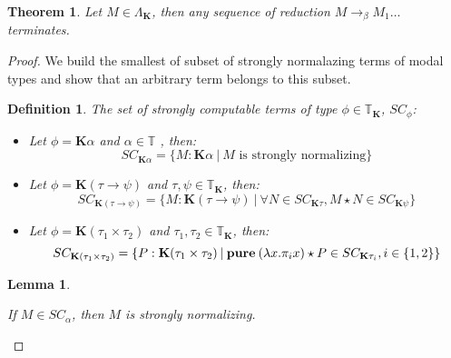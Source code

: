 \documentclass[a4paper]{article}
\newtheorem{theorem}{Theorem}
\newtheorem{lemma}{Lemma}
\newtheorem{defin}{Definition}
\begin{document}
  \begin{theorem}

    Let $M \in \Lambda_{\textbf{K}}$, then any sequence of reduction $M \rightarrow_{\beta} M_1 \dots$ terminates.

  \end{theorem}

  \begin{proof}

  We build the smallest of subset of strongly normalazing terms of modal types and show that an arbitrary
  term belongs to this subset.

  \begin{defin} The set of strongly computable terms of type $\phi \in \mathbb{T}_{\textbf{K}}$, $SC_{\phi}$:

  \begin{itemize}
  \item Let $\phi = \textbf{K}\alpha$ and $\alpha \in \mathbb{T}$ , then:
  \begin{equation}
  SC_{\textbf{K}\alpha} = \{ M : \textbf{K}\alpha \: | \: \text{$M$ is strongly normalizing} \}
  \end{equation}

  \item Let $\phi = \textbf{K}(\tau \to \psi)$ and $\tau, \psi \in \mathbb{T}_{\textbf{K}}$, then:
  \begin{equation}
  SC_{\textbf{K}(\tau \to \psi)} = \{ M : \textbf{K}(\tau \to \psi) \: | \: \forall N \in SC_{\textbf{K}\tau}, M \star N \in SC_{\textbf{K}\psi}\}
  \end{equation}

  \item Let $\phi = \textbf{K}(\tau_1 \times \tau_2)$ and $\tau_1, \tau_2 \in \mathbb{T}_{\textbf{K}}$, then:
  \begin{equation}
  SC_{\textbf{K}(\tau_1 \times \tau_2)} = \{ P : \textbf{K}(\tau_1 \times \tau_2) \: |
  \: {\bf pure \:} (\lambda x. \pi_i x) \star P \in SC_{\textbf{K}\tau_i}, i \in \{1,2\} \}
  \end{equation}
  \end{itemize}
  \end{defin}

  \begin{lemma}

  $ $

  If $M \in SC_{\alpha}$, then $M$ is strongly normalizing.

  \end{lemma}


\end{proof}
\end{document}
